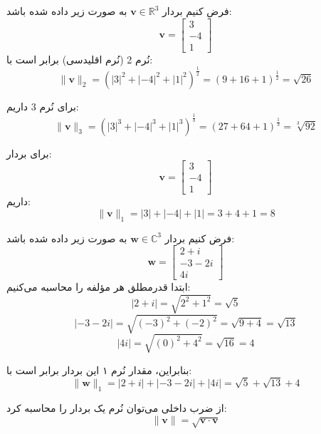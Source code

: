 \begin{example}
فرض کنیم بردار $\mathbf{v} \in \mathbb{R}^3$ به صورت زیر داده شده باشد:
\[
\mathbf{v} = \begin{bmatrix} 3 \\ -4 \\ 1 \end{bmatrix}
\]
نُرم 2 (نُرم اقلیدسی) برابر است با:
\[
\|\mathbf{v}\|_2 = \left( |3|^2 + |-4|^2 + |1|^2 \right)^{\frac{1}{2}}
= \left( 9 + 16 + 1 \right)^{\frac{1}{2}} = \sqrt{26}
\]

برای نُرم 3 داریم:
\[
\|\mathbf{v}\|_3 = \left( |3|^3 + |-4|^3 + |1|^3 \right)^{\frac{1}{3}}
= \left( 27 + 64 + 1 \right)^{\frac{1}{3}} = \sqrt[3]{92}
\]

\end{example}
\begin{example}[محاسبه نُرم ۱]
برای بردار:
\[
\mathbf{v} = \begin{bmatrix} 3 \\ -4 \\ 1 \end{bmatrix}
\]
داریم:
\[
\|\mathbf{v}\|_1 = |3| + |-4| + |1| = 3 + 4 + 1 = 8
\]
\end{example}
\begin{example}
فرض کنیم بردار $\mathbf{w} \in \mathbb{C}^3$ به صورت زیر داده شده باشد:
\[
\mathbf{w} = \begin{bmatrix} 2 + i \\ -3 - 2i \\ 4i \end{bmatrix}
\]
ابتدا قدرمطلق هر مؤلفه را محاسبه می‌کنیم:
\[
|2 + i| = \sqrt{2^2 + 1^2} = \sqrt{5}
\]
\[
|-3 - 2i| = \sqrt{(-3)^2 + (-2)^2} = \sqrt{9 + 4} = \sqrt{13}
\]
\[
|4i| = \sqrt{(0)^2 + 4^2} = \sqrt{16} = 4
\]

بنابراین، مقدار نُرم ۱ این بردار برابر است با:
\[
\|\mathbf{w}\|_1 = |2 + i| + |-3 - 2i| + |4i|
= \sqrt{5} + \sqrt{13} + 4
\]
\end{example}
\begin{definition}
از ضرب داخلی می‌توان نُرم یک بردار را محاسبه کرد:
\[
\|\mathbf{v}\| = \sqrt{\mathbf{v} \cdot \mathbf{v}}
\]
\end{definition}

